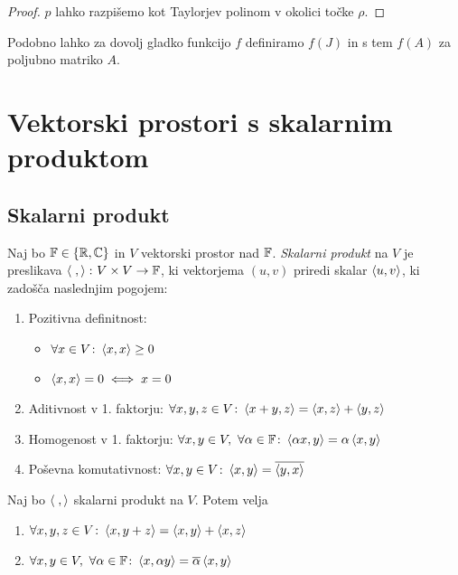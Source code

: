 \documentclass[12pt, a4paper]{article}
\begin{document}
\begin{proof}
$p$ lahko razpišemo kot Taylorjev polinom v okolici točke $\rho$.
\end{proof}

\begin{opomba}
Podobno lahko za dovolj gladko funkcijo $f$ definiramo $f(J)$ in s tem $f(A)$ za poljubno matriko $A$.
\end{opomba}

\newpage

\section{Vektorski prostori s skalarnim produktom}

\subsection{Skalarni produkt}

\begin{definicija}
Naj bo $\mathbb{F}\in\left\{\mathbb{R},\mathbb{C}\right\}$ in $V$ vektorski prostor nad $\mathbb{F}$. \emph{Skalarni produkt} na $V$ je preslikava $\left\langle \;,\right\rangle\colon V\times V\to\mathbb{F}$, ki vektorjema $(u,v)$ priredi skalar $\left\langle u,v\right\rangle$, ki zadošča naslednjim pogojem:

\begin{enumerate}[label=\arabic*)]
\item  Pozitivna definitnost:

\begin{itemize}
\item $\forall x\in V\colon \left\langle x,x\right\rangle\geq 0$
\item $\left\langle x,x\right\rangle=0\iff x=0$\end{itemize}

\item Aditivnost v 1. faktorju: $\forall x,y,z\in V\colon \left\langle x+y,z\right\rangle=\left\langle x,z\right\rangle+\left\langle y,z\right\rangle$
\item Homogenost v 1. faktorju: $\forall x,y\in V,~\forall\alpha\in\mathbb{F}\colon \left\langle \alpha x,y\right\rangle=\alpha\left\langle x,y\right\rangle$
\item Poševna komutativnost: $\forall x,y\in V\colon \left\langle x,y\right\rangle=\overline{\left\langle y,x\right\rangle}$
\end{enumerate}
\end{definicija}

\begin{posledica}
Naj bo $\left\langle \;,\right\rangle$ skalarni produkt na $V$. Potem velja

\begin{enumerate}[label=\arabic*)]
\item $\forall x,y,z\in V\colon \left\langle x,y+z\right\rangle=\left\langle x,y\right\rangle+\left\langle x,z\right\rangle$
\item $\forall x,y\in V,~\forall\alpha\in\mathbb{F}\colon \left\langle x,\alpha y\right\rangle=\overline{\alpha}\left\langle x,y\right\rangle$
\end{enumerate}
\end{posledica}
\end{document}
